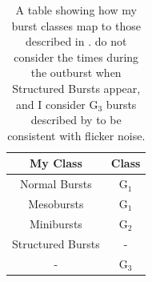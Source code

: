 \begin{table}
\centering
\begin{tabular}{c c}
\hline
\hline
 \scriptsize My Class & \scriptsize \citeauthor{Giles_BP} Class  \\
\hline
Normal Bursts\index{Normal burst} & G$_1$ \\
Mesobursts\index{Mesoburst} & G$_1$ \\
Minibursts\index{Miniburst} & G$_2$ \\
Structured Bursts\index{Structured bursting} & - \\
 - & G$_3$ \\
\hline
\hline
\end{tabular}
\caption[A table showing how my burst classes for the Bursting Pulsar map to those described in \citet{Giles_BP}.]{A table showing how my burst classes map to those described in \citet{Giles_BP}.  \citeauthor{Giles_BP} do not consider the times during the outburst when Structured Bursts appear, and I consider G$_3$ bursts described by \citeauthor{Giles_BP} to be consistent with flicker noise.}
\label{tab:classcomp}
\end{table}

